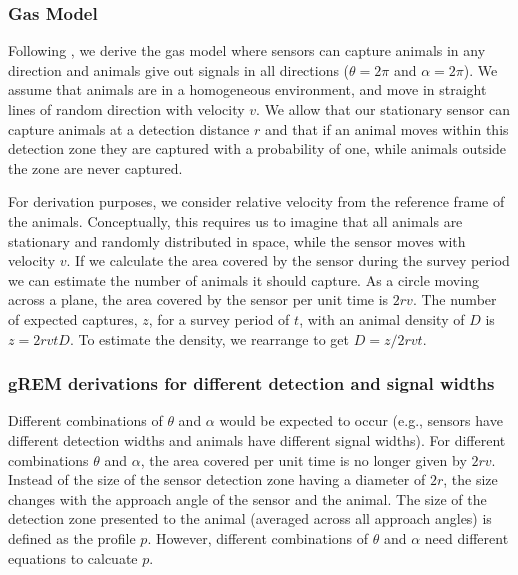 \documentclass[a4paper,10pt,reqno,oneside]{amsart}
\begin{document}
\subsubsection{Gas Model}

Following \cite{yapp1956theory}, we derive the gas model where sensors can capture animals in any direction and animals give out signals in all directions ($ \theta =  2\pi$ and $ \alpha =  2\pi$). We assume that animals are in a homogeneous environment, and move in straight lines of random direction with velocity $v$. We allow that our stationary sensor can capture animals at a detection distance $r$ and that if an animal moves within this detection zone they are captured with a probability of one, while animals outside the zone are never captured.

For derivation purposes, we consider relative velocity from the reference frame of the animals. Conceptually, this requires us to imagine that all animals are stationary and randomly distributed in space, while the sensor moves with velocity $v$. If we calculate the area covered by the sensor during the survey period we can estimate the number of animals it should capture. As a circle moving across a plane, the area covered by the sensor per unit time is $2rv$. The number of expected captures, $z$, for a survey period of $t$, with an animal density of $D$ is $z = 2rvtD$. To estimate the density, we rearrange to get $D = z/2rvt$.

\subsubsection{gREM derivations for different detection and signal widths}
Different combinations of $\theta$ and $\alpha$ would be expected to occur (e.g., sensors have different detection widths and animals have different signal widths). For different combinations $\theta$ and $\alpha$, the area covered per unit time is no longer given by $2rv$. Instead of the size of the sensor detection zone having a diameter of $2r$, the size changes with the approach angle of the sensor and the animal. The size of the detection zone presented to the animal                                                                                                                                                                            	        (averaged across all approach angles) is defined as the profile $p$. However, different combinations of $\theta$ and $\alpha$ need different equations to calcuate $p$. 
\end{document}
